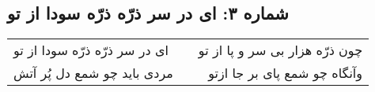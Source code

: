 \begin{center}
\section*{شماره ۳: ای در سر ذرّه ذرّه سودا از تو}
\label{sec:003}
\begin{longtable}{l p{0.5cm} r}
ای در سر ذرّه ذرّه سودا از تو
&&
چون ذرّه هزار بی سر و پا از تو
\\
مردی باید چو شمع دل پُر آتش
&&
وآنگاه چو شمع پای بر جا ازتو
\\
\end{longtable}
\end{center}

